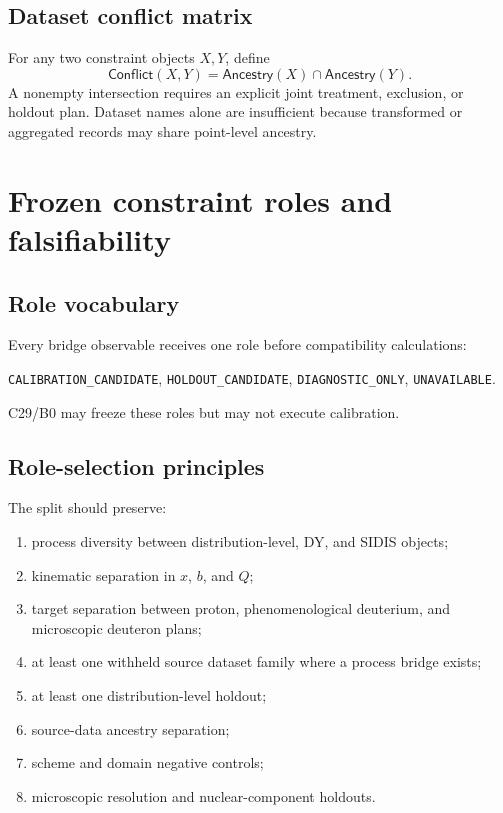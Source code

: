 \documentclass[11pt]{article}
\begin{document}
\subsection{Dataset conflict matrix}

For any two constraint objects \(X,Y\), define
\begin{equation}
 \mathsf{Conflict}(X,Y)
 =
 \mathsf{Ancestry}(X)\cap\mathsf{Ancestry}(Y).
 \label{eq:conflict}
\end{equation}
A nonempty intersection requires an explicit joint treatment, exclusion, or holdout plan.  Dataset names alone are insufficient because transformed or aggregated records may share point-level ancestry.

\section{Frozen constraint roles and falsifiability}
\label{sec:roles}

\subsection{Role vocabulary}

Every bridge observable receives one role before compatibility calculations:
\begin{center}
\texttt{CALIBRATION\_CANDIDATE},
\texttt{HOLDOUT\_CANDIDATE},
\texttt{DIAGNOSTIC\_ONLY},
\texttt{UNAVAILABLE}.
\end{center}
C29/B0 may freeze these roles but may not execute calibration.

\subsection{Role-selection principles}

The split should preserve:
\begin{enumerate}
\item process diversity between distribution-level, DY, and SIDIS objects;
\item kinematic separation in \(x\), \(b\), and \(Q\);
\item target separation between proton, phenomenological deuterium, and microscopic deuteron plans;
\item at least one withheld source dataset family where a process bridge exists;
\item at least one distribution-level holdout;
\item source-data ancestry separation;
\item scheme and domain negative controls;
\item microscopic resolution and nuclear-component holdouts.
\end{enumerate}
\end{document}
